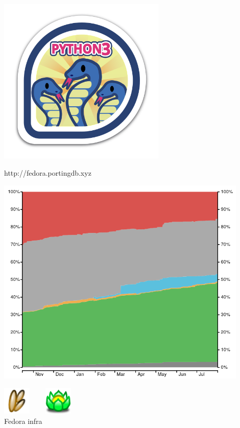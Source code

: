 \documentclass[1610,20pt]{beamer}
\begin{document}
\begin{center}
\begin{frame}[fragile]
    \includegraphics[width=0.6\textwidth]{parselmouth3}

    http://fedora.portingdb.xyz
\end{frame}

\begin{frame}[fragile]
    \includegraphics[width=0.9\textwidth]{history-graph}
\end{frame}

\begin{frame}[fragile]
    \includegraphics[width=0.1\textwidth]{koji-icon} ~~~
    \includegraphics[width=0.1\textwidth]{bodhi-logo}\\
    Fedora infra


\end{frame}
\end{center}
\end{document}
